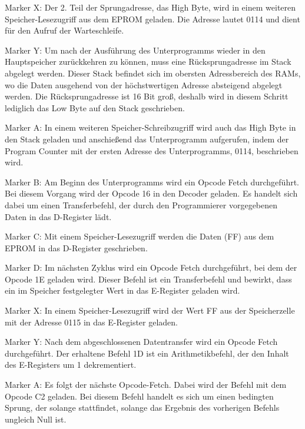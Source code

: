 Marker X: Der 2. Teil der Sprungadresse, das High Byte, wird in einem weiteren Speicher-Lesezugriff aus dem EPROM geladen. Die Adresse lautet 0114 und dient für den Aufruf der Warteschleife.

Marker Y: Um nach der Ausführung des Unterprogramms wieder in den Hauptspeicher zurückkehren zu können, muss eine Rücksprungadresse im Stack abgelegt werden. Dieser Stack befindet sich im obersten Adressbereich des RAMs, wo die Daten ausgehend von der höchstwertigen Adresse absteigend abgelegt werden. Die Rücksprungadresse ist 16 Bit groß, deshalb wird in diesem Schritt lediglich das Low Byte auf den Stack geschrieben.

Marker A: In einem weiteren Speicher-Schreibzugriff wird auch das High Byte in den Stack geladen und anschießend das Unterprogramm aufgerufen, indem der Program Counter mit der ersten Adresse des Unterprogramms, 0114, beschrieben wird.

Marker B: Am Beginn des Unterprogramms wird ein Opcode Fetch durchgeführt. Bei diesem Vorgang wird der Opcode 16 in den Decoder geladen. Es handelt sich dabei um einen Transferbefehl, der durch den Programmierer vorgegebenen Daten in das D-Register lädt.

Marker C: Mit einem Speicher-Lesezugriff werden die Daten (FF) aus dem EPROM in das D-Register geschrieben.

Marker D: Im nächsten Zyklus wird ein Opcode Fetch durchgeführt, bei dem der Opcode 1E geladen wird. Dieser Befehl ist ein Transferbefehl und bewirkt, dass ein im Speicher festgelegter Wert in das E-Register geladen wird.

Marker X: In einem Speicher-Lesezugriff wird der Wert FF aus der Speicherzelle mit der Adresse 0115 in das E-Register geladen.

Marker Y: Nach dem abgeschlossenen Datentransfer wird ein Opcode Fetch durchgeführt. Der erhaltene Befehl 1D ist ein Arithmetikbefehl, der den Inhalt des E-Registers um 1 dekrementiert.

Marker A: Es folgt der nächste Opcode-Fetch. Dabei wird der Befehl mit dem Opcode C2 geladen. Bei diesem Befehl handelt es sich um einen bedingten Sprung, der solange stattfindet, solange das Ergebnis des vorherigen Befehls ungleich Null ist.

